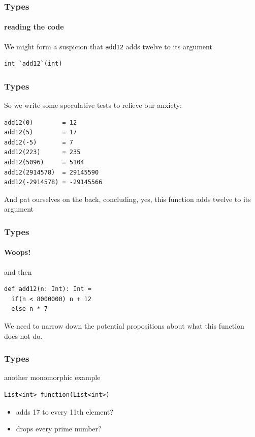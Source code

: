 \begin{frame}[fragile]
\frametitle{Types}
\framesubtitle{reading the code}
We might form a suspicion that \lstinline[style=scala]$add12$ adds twelve to its argument
\begin{lstlisting}[style=scala]
int `add12`(int)
\end{lstlisting}
\end{frame}

\begin{frame}[fragile]
\frametitle{Types}
So we write some speculative tests to relieve our anxiety:
\begin{lstlisting}
add12(0)        = 12
add12(5)        = 17
add12(-5)       = 7
add12(223)      = 235
add12(5096)     = 5104
add12(2914578)  = 29145590
add12(-2914578) = -29145566
\end{lstlisting}
And pat ourselves on the back, concluding, yes, this function adds twelve to its argument
\end{frame}

\begin{frame}[fragile]
\frametitle{Types}
\framesubtitle{Woops!}
\begin{block}{and then}
\begin{lstlisting}
def add12(n: Int): Int =
  if(n < 8000000) n + 12
  else n * 7
\end{lstlisting}
\end{block}
We need to narrow down the potential propositions about what this function does not do.
\end{frame}

\begin{frame}[fragile]
\frametitle{Types}
\begin{block}{another monomorphic example}
\begin{lstlisting}
List<int> function(List<int>)
\end{lstlisting}
\end{block}
\begin{itemize}
  \item<1-> adds 17 to every 11th element?
  \item<2-> drops every prime number?
\end{itemize}
\end{frame}

